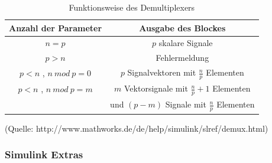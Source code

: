 \documentclass[fontsize = 12pt, paper = a4]{scrreprt}
\begin{document}
\vspace*{-6mm}

\begin{table}[h]
\centering

\caption{Funktionsweise des Demultiplexers}

 \begin{tabular}{ c | c }
 
 \toprule[1.5pt]
 \textbf{Anzahl der Parameter} & \textbf{Ausgabe des Blockes} \\ 
 
 \midrule
 $n = p$    & $p$ skalare Signale   \\
 $p > n$    & Fehlermeldung       \\
 $p < n$ , $n\ mod\ p = 0$ & $p$ Signalvektoren mit $\frac{n}{p}$ Elementen \\
 $p < n$ , $n\ mod\ p = m$ & $m$ Vektorsignale mit $\frac{n}{p}+1$ Elementen \\
    & und $(p-m)$ Signale mit $\frac{n}{p}$ Elementen   \\ 
  
 \bottomrule[1.5pt]
 
\end{tabular}

\end{table}
 
\vspace{\baselineskip}

\vspace*{-8mm}


\begin{centering}
(Quelle: http://www.mathworks.de/de/help/simulink/slref/demux.html)
\end{centering}
\newpage


\subsubsection{Simulink Extras}
\end{document}
